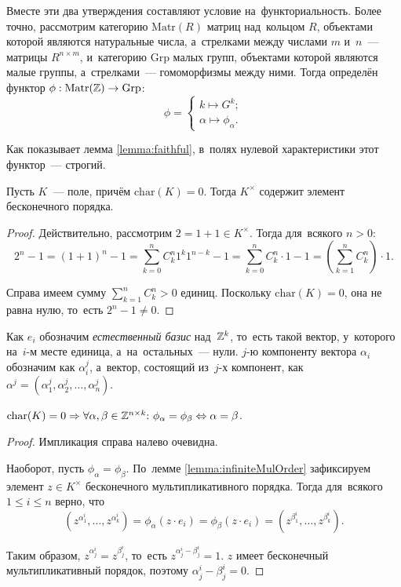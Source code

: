 \documentclass[a4paper,oneside]{article}
\begin{document}
Вместе эти два утверждения составляют условие на~функториальность. Более точно, рассмотрим категорию
$\mathrm{Matr}(R)$ матриц над~кольцом $R$, объектами которой являются натуральные числа, а~стрелками
между числами $m$ и~$n$~— матрицы $R^{n \times m}$, и~категорию $\mathrm{Grp}$ малых групп,
объектами которой являются малые группы, а~стрелками~— гомоморфизмы между ними.
Тогда определён функтор $\phi : \mathrm{Matr}(\mathbb{Z}) \rightarrow \mathrm{Grp}$:
$$
    \phi = \begin{cases}
        k \mapsto G^k; \\
        \alpha \mapsto \phi_\alpha.
    \end{cases}
$$

Как показывает лемма \ref{lemma:faithful}, в~полях нулевой характеристики этот функтор~— строгий.

\begin{lemma}
\label{lemma:infiniteMulOrder}
    Пусть $K$~— поле, причём $\mathrm{char}(K) = 0$.
    Тогда $K^\times$ содержит элемент бесконечного порядка.
\end{lemma}

\begin{proof}
    Действительно, рассмотрим $2 = 1 + 1 \in K^\times$. Тогда для~всякого $n > 0$:
    $$
        2^n - 1 = (1 + 1)^n - 1 = \sum_{k = 0}^n C^n_k 1^k 1^{n - k} - 1
                                = \sum_{k = 0}^n C^n_k \cdot 1 - 1
                                = \left(\sum_{k = 1}^n C^n_k \right) \cdot 1.
    $$

    Справа имеем сумму $\sum_{k = 1}^n C^n_k > 0$ единиц. Поскольку $\mathrm{char}(K) = 0$,
    она не равна нулю, то~есть $2^n - 1 \neq 0$.
\end{proof}

Как $e_i$ обозначим \textit{естественный базис} над~$\mathbb{Z}^k$, то~есть такой вектор, у~которого на~$i$-м месте единица, а~на~остальных~— нули.
$j$-ю компоненту вектора $\alpha_i$ обозначим как $\alpha_i^j$, а~вектор, состоящий из~$j$-х компонент,
как $\alpha^j = (\alpha_1^j, \alpha_2^j, \ldots, \alpha_n^j)$.

\begin{lemma}
\label{lemma:faithful}
    $
        \mathrm{char}(K) = 0 \Rightarrow \forall \alpha, \beta \in \mathbb{Z}^{n \times k}{:} \ \phi_\alpha = \phi_\beta \Leftrightarrow \alpha = \beta
    $.
\end{lemma}

\begin{proof}
    Импликация справа налево очевидна.

    Наоборот, пусть $\phi_\alpha = \phi_\beta$. По~лемме \ref{lemma:infiniteMulOrder} зафиксируем
    элемент $z \in K^\times$ бесконечного мультипликативного порядка.
    Тогда для~всякого $1 \leq i \leq n$ верно, что
    $$
        (z^{\alpha_1^i}, \ldots, z^{\alpha_k^i}) = \phi_\alpha(z \cdot e_i) = \phi_\beta(z \cdot e_i) = (z^{\beta_1^i}, \ldots, z^{\beta_k^i}).
    $$

    Таким образом, $z^{\alpha_j^i} = z^{\beta_j^i}$, то~есть $z^{\alpha_j^i - \beta_j^i} = 1$.
    $z$ имеет бесконечный мультипликативный порядок, поэтому $\alpha_j^i - \beta_j^i = 0$.
\end{proof}
\end{document}
